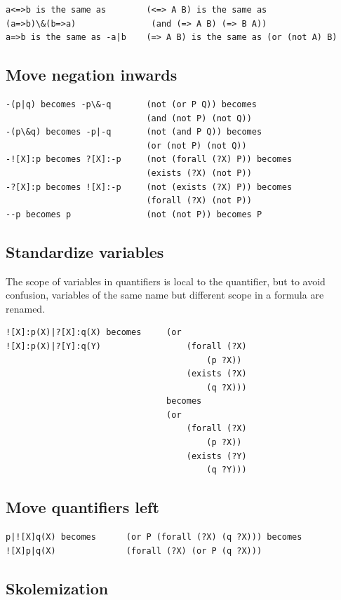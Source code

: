 \documentclass{book}
\begin{document}
\begin{verbatim}					
a<=>b is the same as        (<=> A B) is the same as 
(a=>b)\&(b=>a)               (and (=> A B) (=> B A))
a=>b is the same as -a|b	(=> A B) is the same as (or (not A) B)
\end{verbatim}

\subsection{Move negation inwards}

\begin{verbatim}
-(p|q) becomes -p\&-q		(not (or P Q)) becomes 
					        (and (not P) (not Q))
-(p\&q) becomes -p|-q		(not (and P Q)) becomes 
					        (or (not P) (not Q))
-![X]:p becomes ?[X]:-p		(not (forall (?X) P)) becomes 
					        (exists (?X) (not P))
-?[X]:p becomes ![X]:-p		(not (exists (?X) P)) becomes 
					        (forall (?X) (not P))
--p becomes p			    (not (not P)) becomes P
\end{verbatim}

\subsection{Standardize variables}

The scope of variables in quantifiers is local to the quantifier, but to avoid
confusion, variables of the same name but different scope in a formula are
renamed.

\begin{verbatim}
![X]:p(X)|?[X]:q(X) becomes	    (or 
![X]:p(X)|?[Y]:q(Y)		            (forall (?X) 
					                    (p ?X)) 
					                (exists (?X) 
					                    (q ?X)))
					            becomes
					            (or 
					                (forall (?X) 
					                    (p ?X)) 
					                (exists (?Y) 
					                    (q ?Y)))
\end{verbatim}

\subsection{Move quantifiers left}

\begin{verbatim}
p|![X]q(X) becomes 		(or P (forall (?X) (q ?X))) becomes
![X]p|q(X)				(forall (?X) (or P (q ?X)))
\end{verbatim}

\subsection{Skolemization}
\end{document}
